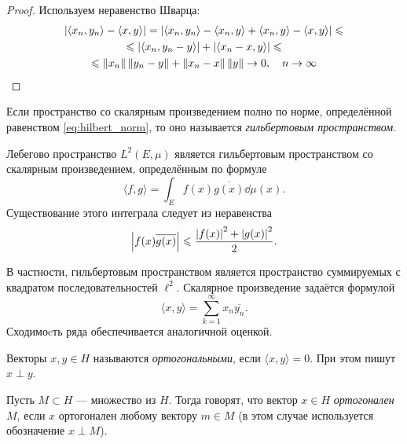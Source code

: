 \begin{proof}
    Используем неравенство Шварца:
    \begin{multline*}
        \left|\langle x_n , y_n \rangle - \langle x, y \rangle\right| = \left|\langle
            x_n, y_n \rangle - \langle x_n, y \rangle + \langle x_n, y \rangle -
        \langle x, y \rangle\right| \leqslant \\ \leqslant \left|\langle x_n, y_n - y \rangle\right| +
        \left|\langle x_n - x, y \rangle\right| \leqslant \\ \leqslant \left\|x_n\right\|\left\|y_n - y\right\| +
        \left\|x_n - x\right\|\left\|y\right\| \to 0, \quad n \to \infty
    \end{multline*}
\end{proof}

\begin{definition}
    Если пространство со скалярным произведением полно по норме, определённой
    равенством \eqref{eq:hilbert_norm}, то оно
    называется \emph{гильбертовым пространством}.
\end{definition}

\begin{example}
    Лебегово пространство $L^2(E, \mu)$ является гильбертовым пространством 
    со скалярным произведением, определённым по формуле
    \[ \langle f, g \rangle = \int_E f(x) \overline{g(x)} \dd \mu(x). \]
    Существование этого интеграла следует из неравенства
    \[ \left|f(x)\overline{g(x)}\right| \leqslant \frac{\left|f(x)\right|^2 + \left|g(x)\right|^2}{2}.
    \]
\end{example}

\begin{example}
    В частности, гильбертовым пространством является пространство суммируемых с
    квадратом последовательностей $\ell^2$. Скалярное произведение задаётся
    формулой
    \[ \langle x, y \rangle = \sum_{k=1}^\infty x_n \overline{y_n}. \]
    Сходимоcть ряда обеспечивается аналогичной оценкой.
\end{example}

\begin{definition}
    Векторы $x, y \in H$ называются \emph{ортогональными}, если $\langle x, y \rangle =
    0$. При этом пишут $x \perp y$.
\end{definition}

\begin{definition}
    Пусть $M \subset H$ --- множество из $H$. Тогда говорят, что вектор
    $x \in H$ \emph{ортогонален} $M$, если $x$ ортогонален любому вектору $m \in
    M$ (в этом случае используется обозначение $x \perp M$).
\end{definition}

